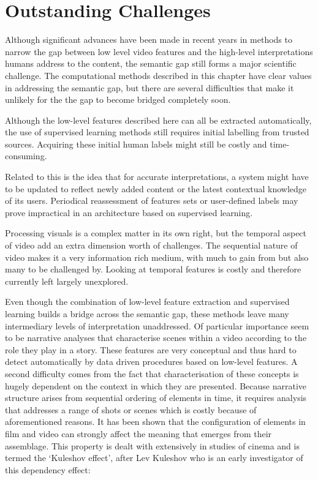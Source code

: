 \section{Outstanding Challenges} %
\label{sec:outstanding_challenges}

Although significant advances have been made in recent years in methods to narrow the gap between low level video features and the high-level interpretations humans address to the content, the semantic gap still forms a major scientific challenge. The computational methods described in this chapter have clear values in addressing the semantic gap, but there are several difficulties that make it unlikely for the the gap to become bridged completely soon.

Although the low-level features described here can all be extracted automatically, the use of supervised learning methods still requires initial labelling from trusted sources. Acquiring these initial human labels might still be costly and time-consuming.

Related to this is the idea that for accurate interpretations, a system might have to be updated to reflect newly added content or the latest contextual knowledge of its users. Periodical reassessment of features sets or user-defined labels may prove impractical in an architecture based on supervised learning.

Processing visuals is a complex matter in its own right, but the temporal aspect of video add an extra dimension worth of challenges. The sequential nature of video makes it a very information rich medium, with much to gain from but also many to be  challenged by. Looking at temporal features is costly and therefore currently left largely unexplored.

Even though the combination of low-level feature extraction and supervised learning builds a bridge across the semantic gap, these methods leave many intermediary levels of interpretation unaddressed. Of particular importance seem to be narrative analyses that characterise scenes within a video according to the role they play in a story. These features are very conceptual and thus hard to detect automatically by data driven procedures based on low-level features. A second difficulty comes from the fact that characterisation of these concepts is hugely dependent on the context in which they are presented. Because narrative structure arises from sequential ordering of elements in time, it requires analysis that addresses a range of shots or scenes which is costly because of aforementioned reasons. It has been shown that the configuration of elements in film and video can strongly affect the meaning that emerges from their assemblage. This property is dealt with extensively in studies of cinema\cite{Bordwell:1985tz} and is termed the `Kuleshov effect', after Lev Kuleshov who is an early investigator of this dependency effect:


